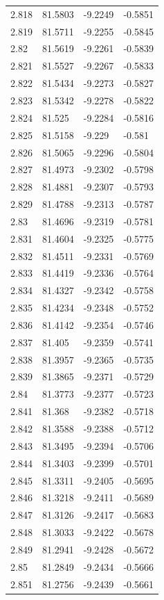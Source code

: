 \begin{tabular}{llll}
2.818 & 81.5803 & -9.2249 & -0.5851 \\
2.819 & 81.5711 & -9.2255 & -0.5845 \\
2.82 & 81.5619 & -9.2261 & -0.5839 \\
2.821 & 81.5527 & -9.2267 & -0.5833 \\
2.822 & 81.5434 & -9.2273 & -0.5827 \\
2.823 & 81.5342 & -9.2278 & -0.5822 \\
2.824 & 81.525 & -9.2284 & -0.5816 \\
2.825 & 81.5158 & -9.229 & -0.581 \\
2.826 & 81.5065 & -9.2296 & -0.5804 \\
2.827 & 81.4973 & -9.2302 & -0.5798 \\
2.828 & 81.4881 & -9.2307 & -0.5793 \\
2.829 & 81.4788 & -9.2313 & -0.5787 \\
2.83 & 81.4696 & -9.2319 & -0.5781 \\
2.831 & 81.4604 & -9.2325 & -0.5775 \\
2.832 & 81.4511 & -9.2331 & -0.5769 \\
2.833 & 81.4419 & -9.2336 & -0.5764 \\
2.834 & 81.4327 & -9.2342 & -0.5758 \\
2.835 & 81.4234 & -9.2348 & -0.5752 \\
2.836 & 81.4142 & -9.2354 & -0.5746 \\
2.837 & 81.405 & -9.2359 & -0.5741 \\
2.838 & 81.3957 & -9.2365 & -0.5735 \\
2.839 & 81.3865 & -9.2371 & -0.5729 \\
2.84 & 81.3773 & -9.2377 & -0.5723 \\
2.841 & 81.368 & -9.2382 & -0.5718 \\
2.842 & 81.3588 & -9.2388 & -0.5712 \\
2.843 & 81.3495 & -9.2394 & -0.5706 \\
2.844 & 81.3403 & -9.2399 & -0.5701 \\
2.845 & 81.3311 & -9.2405 & -0.5695 \\
2.846 & 81.3218 & -9.2411 & -0.5689 \\
2.847 & 81.3126 & -9.2417 & -0.5683 \\
2.848 & 81.3033 & -9.2422 & -0.5678 \\
2.849 & 81.2941 & -9.2428 & -0.5672 \\
2.85 & 81.2849 & -9.2434 & -0.5666 \\
2.851 & 81.2756 & -9.2439 & -0.5661 \\

\end{tabular}
